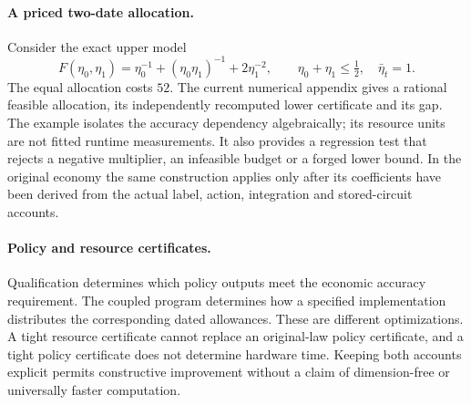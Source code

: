 \paragraph{A priced two-date allocation.}
Consider the exact upper model
\[
 F(\eta_0,\eta_1)=\eta_0^{-1}
             +(\eta_0\eta_1)^{-1}+2\eta_1^{-2},
 \qquad\eta_0+\eta_1\le\tfrac12,\quad\bar\eta_t=1.
\]
The equal allocation costs $52$. The current numerical appendix gives a rational feasible allocation, its independently recomputed lower certificate and its gap. The example isolates the accuracy dependency algebraically; its resource units are not fitted runtime measurements. It also provides a regression test that rejects a negative multiplier, an infeasible budget or a forged lower bound. In the original economy the same construction applies only after its coefficients have been derived from the actual label, action, integration and stored-circuit accounts.

\paragraph{Policy and resource certificates.}
Qualification determines which policy outputs meet the economic accuracy requirement. The coupled program determines how a specified implementation distributes the corresponding dated allowances. These are different optimizations. A tight resource certificate cannot replace an original-law policy certificate, and a tight policy certificate does not determine hardware time. Keeping both accounts explicit permits constructive improvement without a claim of dimension-free or universally faster computation.
